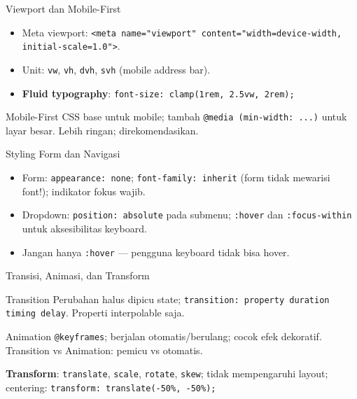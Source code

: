 \documentclass[handout]{beamer}
\begin{document}
\begin{frame}{Viewport dan Mobile-First}
	\begin{itemize}
		\item Meta viewport: \texttt{<meta name="viewport" content="width=device-width, initial-scale=1.0">}.
		\item Unit: \texttt{vw}, \texttt{vh}, \texttt{dvh}, \texttt{svh} (mobile address bar).
		\item \textbf{Fluid typography}: \texttt{font-size: clamp(1rem, 2.5vw, 2rem);}
	\end{itemize}
	\begin{block}{Mobile-First}
		CSS base untuk mobile; tambah \texttt{@media (min-width: ...)} untuk layar besar. Lebih ringan; direkomendasikan.
	\end{block}
\end{frame}

\begin{frame}{Styling Form dan Navigasi}
	\begin{itemize}
		\item Form: \texttt{appearance: none}; \texttt{font-family: inherit} (form tidak mewarisi font!); indikator fokus wajib.
		\item Dropdown: \texttt{position: absolute} pada submenu; \texttt{:hover} dan \texttt{:focus-within} untuk aksesibilitas keyboard.
		\item Jangan hanya \texttt{:hover} --- pengguna keyboard tidak bisa hover.
	\end{itemize}
\end{frame}

\begin{frame}{Transisi, Animasi, dan Transform}
	\begin{block}{Transition}
		Perubahan halus dipicu state; \texttt{transition: property duration timing delay}. Properti interpolable saja.
	\end{block}
	\begin{block}{Animation}
		\texttt{@keyframes}; berjalan otomatis/berulang; cocok efek dekoratif. Transition vs Animation: pemicu vs otomatis.
	\end{block}
	\textbf{Transform}: \texttt{translate}, \texttt{scale}, \texttt{rotate}, \texttt{skew}; tidak mempengaruhi layout; centering: \texttt{transform: translate(-50\%, -50\%);}
\end{frame}
\end{document}
